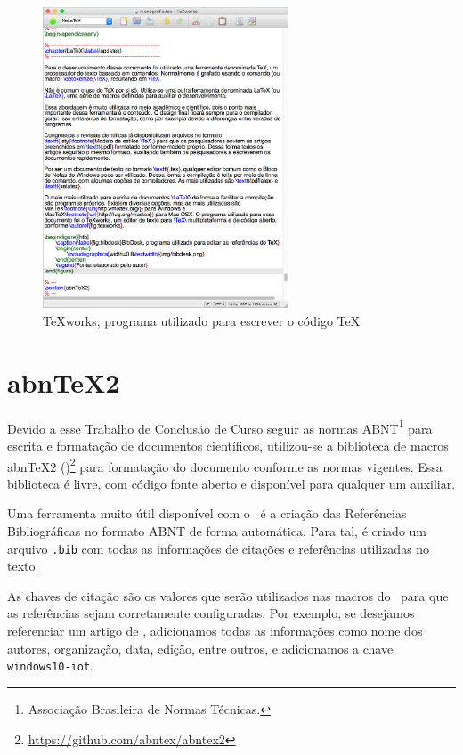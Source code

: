 \begin{figure}[htb]
	\caption{\label{fig:texworks}TeXworks, programa utilizado para escrever o código \TeX}
	\begin{center}
		\includegraphics[width=0.65\textwidth]{img/texworks.jpg}
	\end{center}
\end{figure}

\section{abnTeX2}

Devido a esse Trabalho de Conclusão de Curso seguir as normas ABNT\footnote{Associação Brasileira de Normas Técnicas.} para escrita e formatação de documentos científicos, utilizou-se a biblioteca de macros abnTeX2 (\abnTeX)\footnote{\url{https://github.com/abntex/abntex2}} para formatação do documento conforme as normas vigentes. Essa biblioteca é livre, com código fonte aberto e disponível para qualquer um auxiliar.

Uma ferramenta muito útil disponível com o \abnTeX\ é a criação das Referências Bibliográficas no formato ABNT de forma automática. Para tal, é criado um arquivo \texttt{.bib} com todas as informações de citações e referências utilizadas no texto.

As chaves de citação são os valores que serão utilizados nas macros do \abnTeX\ para que as referências sejam corretamente configuradas. Por exemplo, se desejamos referenciar um artigo de , adicionamos todas as informações como nome dos autores, organização, data, edição, entre outros, e adicionamos a chave \texttt{windows10-iot}. 


